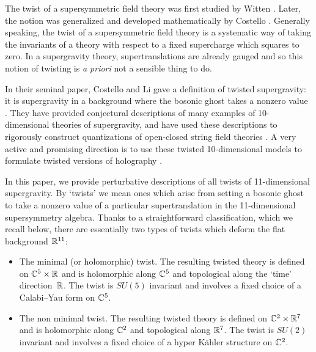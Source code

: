 %
%
%
%
%
%
%

The twist of a supersymmetric field theory was first studied by Witten \cite{WittenTwist}.
Later, the notion was generalized and developed mathematically by Costello \cite{CostelloHol}. 
Generally speaking, the twist of a supersymmetric field theory is a systematic way of taking the invariants of a theory with respect to a fixed supercharge which squares to zero. 
In a supergravity theory, supertranslations are already gauged and so this notion of twisting is {\em a priori} not a sensible thing to do. 

In their seminal paper, Costello and Li gave a definition of twisted supergravity: it is supergravity in a background where the bosonic ghost takes a nonzero value \cite{CLsugra}.
They have provided conjectural descriptions of many examples of 10-dimensional theories of supergravity, and have used these descriptions to rigorously construct quantizations of open-closed string field theories \cite{CLbcov1,CLtypeI}. 
A very active and promising direction is to use these twisted 10-dimensional models to formulate twisted versions of holography \cite{Costello_2021, costello2021twisted, Ishtiaque_2020, budzik2021giant}. 

In this paper, we provide perturbative descriptions of all twists of 11-dimensional supergravity. 
By `twists' we mean ones which arise from setting a bosonic ghost to take a nonzero value of a particular supertranslation in the 11-dimensional supersymmetry algebra. 
Thanks to a straightforward classification, which we recall below, there are essentially two types of twists which deform the flat background $\mathbb R^{11}$: 
\begin{itemize}
\item The minimal (or holomorphic) twist. 
The resulting twisted theory is defined on $\mathbb C^5 \times \mathbb R$ and is holomorphic along $\mathbb C^5$ and topological along the `time' direction~$\mathbb R$. 
The twist is $SU(5)$ invariant and involves a fixed choice of a Calabi--Yau form on $\mathbb C^5$. 
\item The non minimal twist. 
The resulting twisted theory is defined on $\mathbb C^2 \times \mathbb R^7$ and is holomorphic along $\mathbb C^2$ and topological along $\mathbb R^7$.
The twist is $SU(2)$ invariant and involves a fixed choice of a hyper K\"ahler structure on $\mathbb C^2$.  
\end{itemize}

